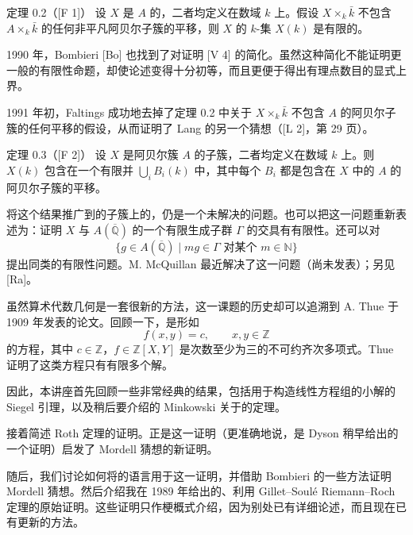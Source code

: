 \begin{statement}{定理 0.2（[F 1]）}
设 $X$ 是 $A$ 的，二者均定义在数域 $k$ 上。假设 $X\times_k\bar k$ 不包含 $A\times_k\bar k$ 的任何非平凡阿贝尔子簇的平移，则 $X$ 的 $k$-集 $X(k)$ 是有限的。
\end{statement}
1990 年，Bombieri [Bo] 也找到了对证明 [V 4] 的简化。虽然这种简化不能证明更一般的有限性命题，却使论述变得十分初等，而且更便于得出有理点数目的显式上界。

1991 年初，Faltings 成功地去掉了定理 0.2 中关于 $X\times_k\bar k$ 不包含 $A$ 的阿贝尔子簇的任何平移的假设，从而证明了 Lang 的另一个猜想（[L 2]，第 29 页）。
\begin{statement}{定理 0.3（[F 2]）}
设 $X$ 是阿贝尔簇 $A$ 的子簇，二者均定义在数域 $k$ 上。则 $X(k)$ 包含在一个有限并 $\bigcup_i B_i(k)$ 中，其中每个 $B_i$ 都是包含在 $X$ 中的 $A$ 的阿贝尔子簇的平移。
\end{statement}
将这个结果推广到的子簇上的，仍是一个未解决的问题。也可以把这一问题重新表述为：证明 $X$ 与 $A(\overline{\mathbb Q})$ 的一个有限生成子群 $\Gamma$ 的交具有有限性。还可以对
\[
\{g\in A(\overline{\mathbb Q})\mid mg\in\Gamma\text{ 对某个 }m\in\mathbb N\}
\]
提出同类的有限性问题。M. McQuillan 最近解决了这一问题（尚未发表）；另见 [Ra]。

虽然算术代数几何是一套很新的方法，这一课题的历史却可以追溯到 A. Thue 于 1909 年发表的论文。回顾一下，是形如
\[
f(x,y)=c,\qquad x,y\in\mathbb Z
\]
的方程，其中 $c\in\mathbb Z$，$f\in\mathbb Z[X,Y]$ 是次数至少为三的不可约齐次多项式。Thue 证明了这类方程只有有限多个解。

因此，本讲座首先回顾一些非常经典的结果，包括用于构造线性方程组的小解的 Siegel 引理，以及稍后要介绍的 Minkowski 关于的定理。

接着简述 Roth 定理的证明。正是这一证明（更准确地说，是 Dyson 稍早给出的一个证明）启发了 Mordell 猜想的新证明。

随后，我们讨论如何将的语言用于这一证明，并借助 Bombieri 的一些方法证明 Mordell 猜想。然后介绍我在 1989 年给出的、利用 Gillet--Soulé Riemann--Roch 定理的原始证明。这些证明只作梗概式介绍，因为别处已有详细论述，而且现在已有更新的方法。

